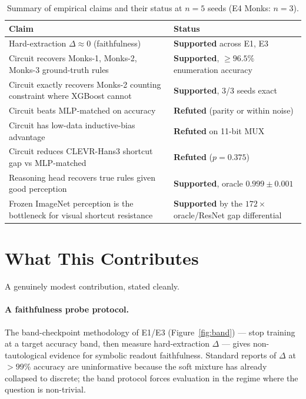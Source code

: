 \documentclass{article}
\begin{document}
\begin{table}[H]
\centering
\caption{Summary of empirical claims and their status at $n{=}5$ seeds (E4 Monks: $n{=}3$).}
\label{tab:claims}
\renewcommand{\arraystretch}{1.15}
\begin{tabular}{p{}p{}}
\toprule
\textbf{Claim} & \textbf{Status} \\
\midrule
Hard-extraction $\Delta \approx 0$ (faithfulness)                               & \textcolor{xgbgreen}{\textbf{Supported}} across E1, E3 \\
Circuit recovers Monks-1, Monks-2, Monks-3 ground-truth rules                   & \textcolor{xgbgreen}{\textbf{Supported}}, $\geq 96.5\%$ enumeration accuracy \\
Circuit exactly recovers Monks-2 counting constraint where XGBoost cannot       & \textcolor{xgbgreen}{\textbf{Supported}}, 3/3 seeds exact \\
Circuit beats MLP-matched on accuracy                                           & \textcolor{red!75!black}{\textbf{Refuted}} (parity or within noise) \\
Circuit has low-data inductive-bias advantage                                   & \textcolor{red!75!black}{\textbf{Refuted}} on 11-bit MUX \\
Circuit reduces CLEVR-Hans3 shortcut gap vs MLP-matched                          & \textcolor{red!75!black}{\textbf{Refuted}} ($p = 0.375$) \\
Reasoning head recovers true rules given good perception                        & \textcolor{xgbgreen}{\textbf{Supported}}, oracle $0.999 \pm 0.001$ \\
Frozen ImageNet perception is the bottleneck for visual shortcut resistance    & \textcolor{xgbgreen}{\textbf{Supported}} by the $172\times$ oracle/ResNet gap differential \\
\bottomrule
\end{tabular}
\end{table}

\section{What This Contributes}
\label{sec:contributions}

A genuinely modest contribution, stated cleanly.

\paragraph{A faithfulness probe protocol.}
The band-checkpoint methodology of E1/E3 (Figure~\ref{fig:band}) --- stop training at a target accuracy band, then measure hard-extraction $\Delta$ --- gives non-tautological evidence for symbolic readout faithfulness.
Standard reports of $\Delta$ at $>99\%$ accuracy are uninformative because the soft mixture has already collapsed to discrete; the band protocol forces evaluation in the regime where the question is non-trivial.
\end{document}
